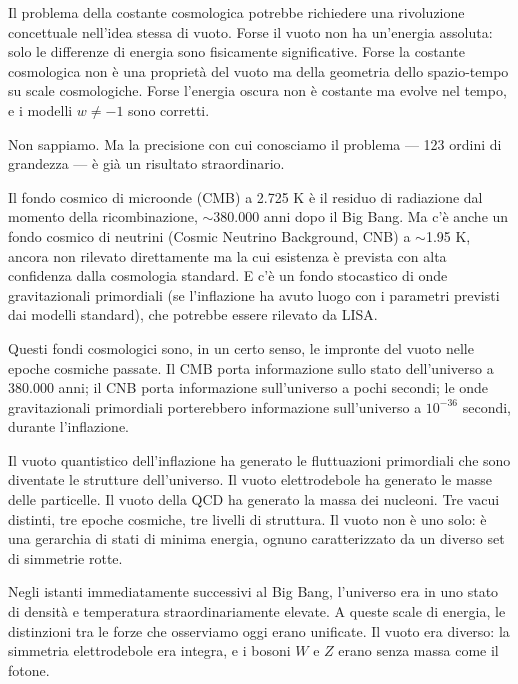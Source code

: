 \documentclass[12pt,a4paper,openany]{book}
\newcommand{\sezione}[1]{\vspace{1.2em}{\large\bfseries #1}\vspace{0.5em}\par}
\begin{document}
Il problema della costante cosmologica potrebbe richiedere una rivoluzione concettuale nell'idea stessa di vuoto. Forse il vuoto non ha un'energia assoluta: solo le differenze di energia sono fisicamente significative. Forse la costante cosmologica non è una proprietà del vuoto ma della geometria dello spazio-tempo su scale cosmologiche. Forse l'energia oscura non è costante ma evolve nel tempo, e i modelli $w \neq -1$ sono corretti.

Non sappiamo. Ma la precisione con cui conosciamo il problema --- 123 ordini di grandezza --- è già un risultato straordinario.

\sezione{Il vuoto e la radiazione di fondo}

Il fondo cosmico di microonde (CMB) a 2.725 K è il residuo di radiazione dal momento della ricombinazione, $\sim$380.000 anni dopo il Big Bang. Ma c'è anche un fondo cosmico di neutrini (Cosmic Neutrino Background, CNB) a $\sim$1.95 K, ancora non rilevato direttamente ma la cui esistenza è prevista con alta confidenza dalla cosmologia standard. E c'è un fondo stocastico di onde gravitazionali primordiali (se l'inflazione ha avuto luogo con i parametri previsti dai modelli standard), che potrebbe essere rilevato da LISA.

Questi fondi cosmologici sono, in un certo senso, le impronte del vuoto nelle epoche cosmiche passate. Il CMB porta informazione sullo stato dell'universo a 380.000 anni; il CNB porta informazione sull'universo a pochi secondi; le onde gravitazionali primordiali porterebbero informazione sull'universo a $10^{-36}$ secondi, durante l'inflazione.

Il vuoto quantistico dell'inflazione ha generato le fluttuazioni primordiali che sono diventate le strutture dell'universo. Il vuoto elettrodebole ha generato le masse delle particelle. Il vuoto della QCD ha generato la massa dei nucleoni. Tre vacui distinti, tre epoche cosmiche, tre livelli di struttura. Il vuoto non è uno solo: è una gerarchia di stati di minima energia, ognuno caratterizzato da un diverso set di simmetrie rotte.

\sezione{Il vuoto come sfondo dei processi cosmologici primordiali}

Negli istanti immediatamente successivi al Big Bang, l'universo era in uno stato di densità e temperatura straordinariamente elevate. A queste scale di energia, le distinzioni tra le forze che osserviamo oggi erano unificate. Il vuoto era diverso: la simmetria elettrodebole era integra, e i bosoni $W$ e $Z$ erano senza massa come il fotone.
\end{document}
